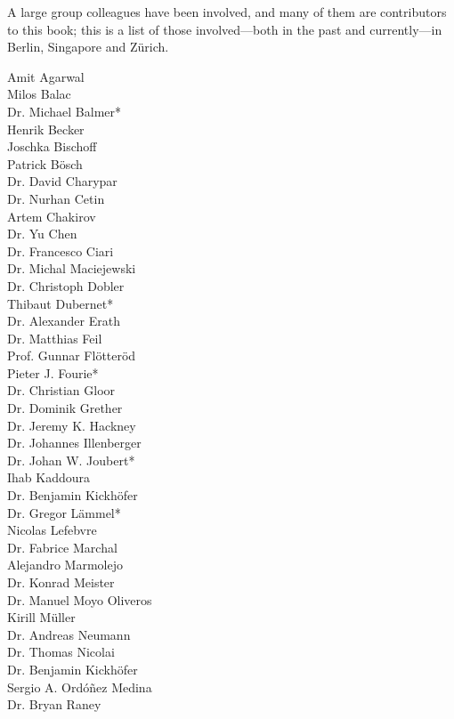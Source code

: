 A large group colleagues have been involved, and many of them are contributors to this book; this is a list of those involved---both in the past and currently---in Berlin, Singapore and Zürich.  

\begin{multicols}{3}
Amit Agarwal \\
Milos Balac  \\
Dr. Michael Balmer\mbox{*} \\
Henrik Becker \\
Joschka Bischoff \\
Patrick Bösch \\
Dr. David Charypar \\
Dr. Nurhan Cetin  \\
Artem Chakirov \\
Dr. Yu Chen \\
Dr. Francesco Ciari \\
Dr. Michal Maciejewski \\
Dr. Christoph Dobler \\
Thibaut Dubernet\mbox{*} \\
Dr. Alexander Erath \\
Dr. Matthias Feil \\
Prof. Gunnar Flötteröd \\
Pieter J. Fourie\mbox{*} \\
Dr. Christian Gloor \\
Dr. Dominik Grether \\
Dr. Jeremy K. Hackney \\
Dr. Johannes Illenberger \\
Dr. Johan W. Joubert\mbox{*} \\
Ihab Kaddoura \\
Dr. Benjamin Kickhöfer \\
Dr. Gregor Lämmel\mbox{*} \\
Nicolas Lefebvre \\
Dr. Fabrice Marchal \\
Alejandro Marmolejo \\
Dr. Konrad Meister \\
Dr. Manuel Moyo Oliveros \\
Kirill Müller \\
Dr. Andreas Neumann \\
Dr. Thomas Nicolai \\
Dr. Benjamin Kickhöfer \\
Sergio A. Ordóñez Medina \\
Dr. Bryan Raney \\

\end{multicols}
